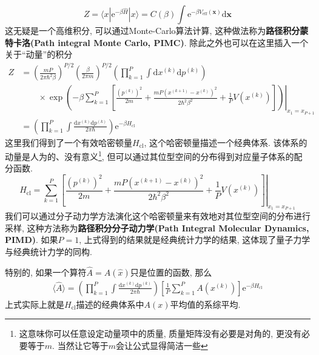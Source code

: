         \begin{equation}
            Z = \langle x|\mathrm{e}^{-\beta \hat{H}}|x\rangle = C(\beta) \int \mathrm{e}^{-\beta V_\mathrm{eff}(\bm{x})} \mathrm{d}\bm{x}
        \end{equation}
        这无疑是一个高维积分, 可以通过Monte-Carlo算法计算, 这种做法称为\textbf{路径积分蒙特卡洛(Path integral Monte Carlo, PIMC)}. 除此之外也可以在这里插入一个关于“动量”的积分
        \begin{equation}\begin{aligned}
            Z &= \left(\frac{mP}{2\pi \hbar^2 \beta}\right)^{P/2} \left(\frac{\beta}{2\pi m}\right)^{P/2} \left( \prod_{k=1}^{P} \int \mathrm{d} x^{(k)} \mathrm{d} p^{(k)} \right) \\ & \qquad\times\left.
            \exp\left( -\beta \sum_{k=1}^{P} \left[\frac{(p^{(k)})^2}{2m}+\frac{mP(x^{(k+1)}-x^{(k)})^2}{2\hbar^2 \beta^2}+\frac{1}{P}V(x^{(k)})\right]\right)\right|_{x_1 = x_{P+1}} \\
            &= \left( \prod_{k=1}^{P} \int \frac{\mathrm{d} x^{(k)} \mathrm{d} p^{(k)}}{2\pi\hbar}  \right) \mathrm{e}^{-\beta H_\mathrm{cl}}
        \end{aligned}\end{equation}
        这里我们得到了一个有效哈密顿量$H_\mathrm{cl}$, 这个哈密顿量描述一个经典体系. 该体系的动量是人为的、没有意义\footnote{这意味你可以任意设定动量项中的质量, 质量矩阵没有必要是对角的, 更没有必要等于$m$. 当然让它等于$m$会让公式显得简洁一些}, 但可以通过其位型空间的分布得到对应量子体系的配分函数. 
        \begin{equation}
            H_\mathrm{cl} = \left. \sum_{k=1}^{P} \left[\frac{(p^{(k)})^2}{2m}+\frac{mP(x^{(k+1)}-x^{(k)})^2}{2\hbar^2 \beta^2}+\frac{1}{P}V(x^{(k)})\right] \right|_{x_1 = x_{P+1}}
        \end{equation}
        我们可以通过分子动力学方法演化这个哈密顿量来有效地对其位型空间的分布进行采样, 这种方法称为\textbf{路径积分分子动力学(Path Integral Molecular Dynamics, PIMD)}. 如果$P=1$, 上式得到的结果就是经典统计力学的结果, 这体现了量子力学与经典统计力学的同构. 

        特别的, 如果一个算符$\hat{A} = A(\hat x)$只是位置的函数, 那么
        \begin{equation}\begin{aligned}
            \langle {\hat A} \rangle = \left( \prod_{k=1}^{P} \int \frac{\mathrm{d} x^{(k)} \mathrm{d} p^{(k)}}{2\pi\hbar}  \right)  \left[ \frac1P\sum_{k=1}^{P}A(x^{(k)}) \right] \mathrm{e}^{-\beta H_\mathrm{cl}}
        \end{aligned}\end{equation}
        上式实际上就是$H_\mathrm{cl}$描述的经典体系中$A(x)$平均值的系综平均.


